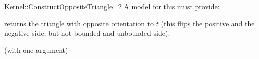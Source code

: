 \begin{ccRefFunctionObjectConcept}{Kernel::ConstructOppositeTriangle_2}
A model for this must provide:


       {returns the triangle with opposite orientation to $t$
        (this flips the positive and the negative side, but
        not bounded and unbounded side).}

\ccRefines
{} (with one argument)

\ccSeeAlso
{} \\

\end{ccRefFunctionObjectConcept}
